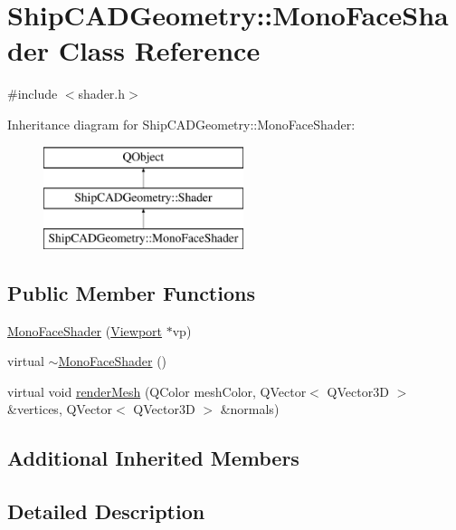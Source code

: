 \hypertarget{classShipCADGeometry_1_1MonoFaceShader}{\section{Ship\-C\-A\-D\-Geometry\-:\-:Mono\-Face\-Shader Class Reference}
\label{classShipCADGeometry_1_1MonoFaceShader}
}


{\ttfamily \#include $<$shader.\-h$>$}

Inheritance diagram for Ship\-C\-A\-D\-Geometry\-:\-:Mono\-Face\-Shader\-:\begin{figure}[H]
\begin{center}
\leavevmode
\includegraphics[height=3.000000cm]{classShipCADGeometry_1_1MonoFaceShader}
\end{center}
\end{figure}
\subsection*{Public Member Functions}
\begin{DoxyCompactItemize}
\item 
\hyperlink{classShipCADGeometry_1_1MonoFaceShader_a963aa389c930d6482a58f49b2ccb4473}{Mono\-Face\-Shader} (\hyperlink{classShipCADGeometry_1_1Viewport}{Viewport} $\ast$vp)
\item 
virtual \hyperlink{classShipCADGeometry_1_1MonoFaceShader_a3779b65915f5a7f8d60a7a78a9a6da56}{$\sim$\-Mono\-Face\-Shader} ()
\item 
virtual void \hyperlink{classShipCADGeometry_1_1MonoFaceShader_a9a358ec63af4b067449e772cbc735d5a}{render\-Mesh} (Q\-Color mesh\-Color, Q\-Vector$<$ Q\-Vector3\-D $>$ \&vertices, Q\-Vector$<$ Q\-Vector3\-D $>$ \&normals)
\end{DoxyCompactItemize}
\subsection*{Additional Inherited Members}


\subsection{Detailed Description}


